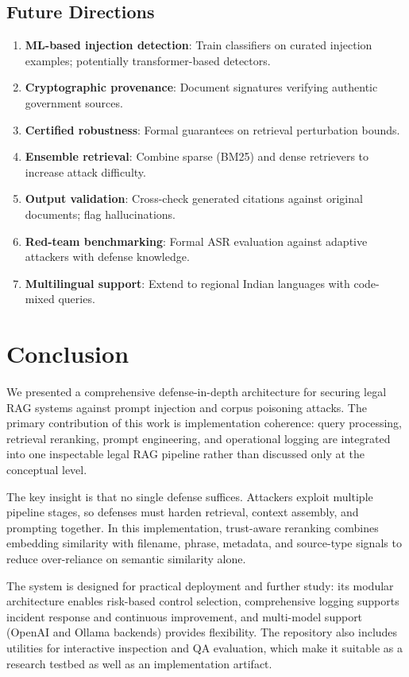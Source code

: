 \documentclass[conference]{IEEEtran}
\begin{document}
\subsection{Future Directions}

\begin{enumerate}
    \item \textbf{ML-based injection detection}: Train classifiers on curated injection examples; potentially transformer-based detectors.
    \item \textbf{Cryptographic provenance}: Document signatures verifying authentic government sources.
    \item \textbf{Certified robustness}: Formal guarantees on retrieval perturbation bounds.
    \item \textbf{Ensemble retrieval}: Combine sparse (BM25) and dense retrievers to increase attack difficulty.
    \item \textbf{Output validation}: Cross-check generated citations against original documents; flag hallucinations.
    \item \textbf{Red-team benchmarking}: Formal ASR evaluation against adaptive attackers with defense knowledge.
    \item \textbf{Multilingual support}: Extend to regional Indian languages with code-mixed queries.
\end{enumerate}

\section{Conclusion}

We presented a comprehensive defense-in-depth architecture for securing legal RAG systems against prompt injection and corpus poisoning attacks. The primary contribution of this work is implementation coherence: query processing, retrieval reranking, prompt engineering, and operational logging are integrated into one inspectable legal RAG pipeline rather than discussed only at the conceptual level.

The key insight is that no single defense suffices. Attackers exploit multiple pipeline stages, so defenses must harden retrieval, context assembly, and prompting together. In this implementation, trust-aware reranking combines embedding similarity with filename, phrase, metadata, and source-type signals to reduce over-reliance on semantic similarity alone.

The system is designed for practical deployment and further study: its modular architecture enables risk-based control selection, comprehensive logging supports incident response and continuous improvement, and multi-model support (OpenAI and Ollama backends) provides flexibility. The repository also includes utilities for interactive inspection and QA evaluation, which make it suitable as a research testbed as well as an implementation artifact.
\end{document}
